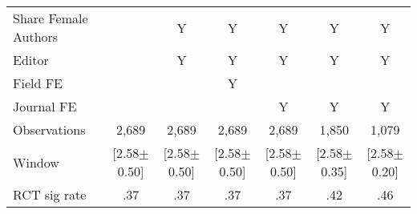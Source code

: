 \begin{tabular}{l*{6}{c}}
Share Female Authors &         &        Y&        Y&        Y&        Y&        Y\\
Editor          &         &        Y&        Y&        Y&        Y&        Y\\
Field FE        &         &         &        Y&         &         &         \\
Journal FE      &         &         &         &        Y&        Y&        Y\\
\hline
Observations    &    2,689&    2,689&    2,689&    2,689&    1,850&    1,079\\
Window          &[2.58$\pm$0.50]&[2.58$\pm$0.50]&[2.58$\pm$0.50]&[2.58$\pm$0.50]&[2.58$\pm$0.35]&[2.58$\pm$0.20]\\
RCT sig rate    &      .37&      .37&      .37&      .37&      .42&      .46\\
\hline\hline
\end{tabular}
